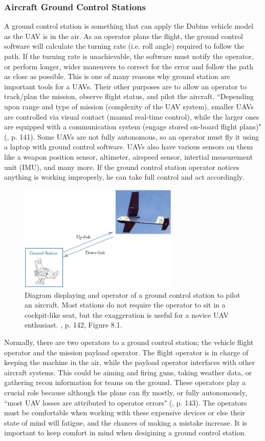 \documentclass[12pt,journal,compsoc]{IEEEtran}
\begin{document}
\subsubsection{Aircraft Ground Control Stations}
A ground control station is something that can apply the Dubins vehicle model as the UAV is in the air. As an operator plans the flight, the ground control software will calculate the turning rate (i.e. roll angle) required to follow the path. If the turning rate is unachievable, the software must notify the operator, or perform longer, wider maneuvers to correct for the error and follow the path as close as possible. This is one of many reasons why ground station are important tools for a UAVs. Their other purposes are to allow an operator to track/plan the mission, observe flight status, and pilot the aircraft. ``Depending upon range and type of mission (complexity of the UAV system), smaller UAVs are controlled via visual contact (manual real-time control), while the larger ones are equipped with a communication system (engage stored on-board flight plans)" (\cite{U-A-D}, p. 141). Some UAVs are not fully autonomous, so an operator must fly it using a laptop with ground control software. UAVs also have various sensors on them like a weapon position sensor, altimeter, airspeed sensor, intertial measurement unit (IMU), and many more. If the ground control station operator notices anything is working improperly, he can take full control and act accordingly.
\begin{figure}[h!]
\hspace*{0cm}
\centering
\includegraphics[width=3in]{groundControl.jpg}
\caption{Diagram displaying and operator of a ground control station to pilot an aircraft. Most stations do not require the operator to sit in a cockpit-like seat, but the exaggeration is useful for a novice UAV enthusiast. \cite{U-A-D}, p. 142, Figure 8.1.}
\label{gcDiagram}
\end{figure}
Normally, there are two operators to a ground control station; the vehicle flight operator and the mission payload operator. The flight operator is in charge of keeping the machine in the air, while the payload operator interfaces with other aircraft systems. This could be aiming and firing guns, taking weather data, or gathering recon information for teams on the ground. These operators play a crucial role because although the plane can fly mostly, or fully autonomously, ``most UAV losses are attributed to operator errors" (\cite{U-A-D}, p. 143). The operators must be comfortable when working with these expensive devices or else their state of mind will fatigue, and the chances of making a mistake increase. It is important to keep comfort in mind when desigining a ground control station.
\end{document}
